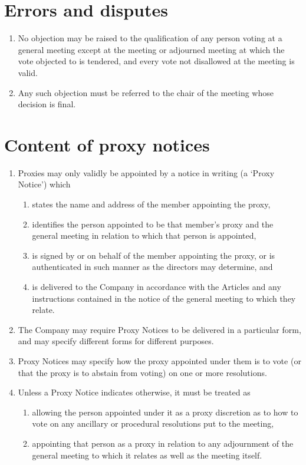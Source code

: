 \documentclass[a4paper,12pt]{article}
\begin{document}
\section{Errors and disputes}

\begin{enumerate}
  \item No objection may be raised to the qualification of any person voting at a general meeting except at the meeting or adjourned meeting at which the vote objected to is tendered, and every vote not disallowed at the meeting is valid.
  \item Any such objection must be referred to the chair of the meeting whose decision is final.
\end{enumerate}

\section{Content of proxy notices}

\begin{enumerate}
  \item Proxies may only validly be appointed by a notice in writing (a `Proxy Notice') which
  \begin{enumerate}
    \item states the name and address of the member appointing the proxy,
    \item identifies the person appointed to be that member's proxy and the general meeting in relation to which that person is appointed,
    \item is signed by or on behalf of the member appointing the proxy, or is authenticated in such manner as the directors may determine, and
    \item is delivered to the Company in accordance with the Articles and any instructions contained in the notice of the general meeting to which they relate.
  \end{enumerate}
  \item The Company may require Proxy Notices to be delivered in a particular form, and may specify different forms for different purposes.
  \item Proxy Notices may specify how the proxy appointed under them is to vote (or that the proxy is to abstain from voting) on one or more resolutions.
  \item Unless a Proxy Notice indicates otherwise, it must be treated as
  \begin{enumerate}
    \item allowing the person appointed under it as a proxy discretion as to how to vote on any ancillary or procedural resolutions put to the meeting,
    \item appointing that person as a proxy in relation to any adjournment of the general meeting to which it relates as well as the meeting itself.
  \end{enumerate}
\end{enumerate}
\end{document}
